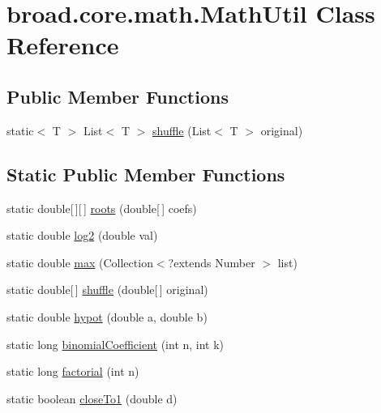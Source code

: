 \hypertarget{classbroad_1_1core_1_1math_1_1_math_util}{\section{broad.\+core.\+math.\+Math\+Util Class Reference}
\label{classbroad_1_1core_1_1math_1_1_math_util}
}
\subsection*{Public Member Functions}
\begin{DoxyCompactItemize}
\item 
static$<$ T $>$ List$<$ T $>$ \hyperlink{classbroad_1_1core_1_1math_1_1_math_util_ad7eaa42068a63ff3cf8a9b4778ee61c5}{shuffle} (List$<$ T $>$ original)
\end{DoxyCompactItemize}
\subsection*{Static Public Member Functions}
\begin{DoxyCompactItemize}
\item 
static double\mbox{[}$\,$\mbox{]}\mbox{[}$\,$\mbox{]} \hyperlink{classbroad_1_1core_1_1math_1_1_math_util_a2a454b4ad2e90161b29c769cac265571}{roots} (double\mbox{[}$\,$\mbox{]} coefs)
\item 
static double \hyperlink{classbroad_1_1core_1_1math_1_1_math_util_a1fce8a9fd06c546eafbe6d00d5a53dc9}{log2} (double val)
\item 
static double \hyperlink{classbroad_1_1core_1_1math_1_1_math_util_a6912b62c2ce54a09cddc63ad57ba7af2}{max} (Collection$<$?extends Number $>$ list)
\item 
static double\mbox{[}$\,$\mbox{]} \hyperlink{classbroad_1_1core_1_1math_1_1_math_util_a5cc54523bf4f129b9c9dcce4d3e580c4}{shuffle} (double\mbox{[}$\,$\mbox{]} original)
\item 
static double \hyperlink{classbroad_1_1core_1_1math_1_1_math_util_a81ba436d1a1f85d6c2591a9bdcaab3b9}{hypot} (double a, double b)
\item 
static long \hyperlink{classbroad_1_1core_1_1math_1_1_math_util_a58478da70c363d994557d12598e1c14b}{binomial\+Coefficient} (int n, int k)
\item 
static long \hyperlink{classbroad_1_1core_1_1math_1_1_math_util_a2aacbbfa7e9794aca8dee387fcbf4121}{factorial} (int n)
\item 
static boolean \hyperlink{classbroad_1_1core_1_1math_1_1_math_util_aa7a9fefae878f5f2770712f45373260a}{close\+To1} (double d)
\end{DoxyCompactItemize}


